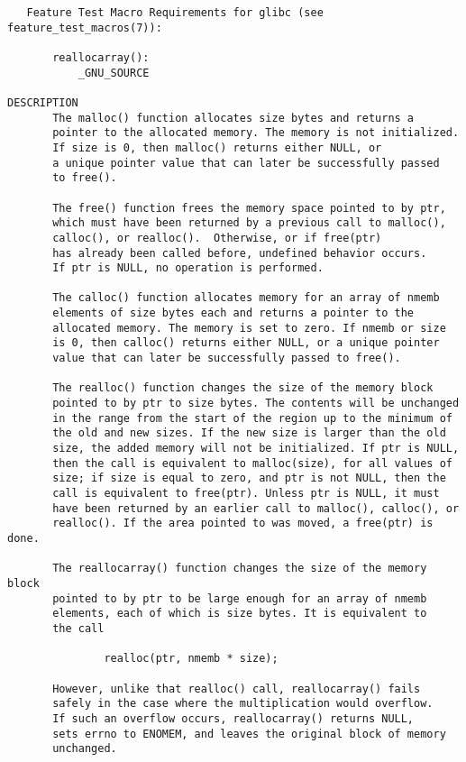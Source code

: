 {\begin{center}
\begin{verbatim}
   Feature Test Macro Requirements for glibc (see feature_test_macros(7)):

       reallocarray():
           _GNU_SOURCE

DESCRIPTION
       The malloc() function allocates size bytes and returns a
       pointer to the allocated memory. The memory is not initialized.
       If size is 0, then malloc() returns either NULL, or     
       a unique pointer value that can later be successfully passed
       to free().

       The free() function frees the memory space pointed to by ptr,
       which must have been returned by a previous call to malloc(),
       calloc(), or realloc().  Otherwise, or if free(ptr)     
       has already been called before, undefined behavior occurs.
       If ptr is NULL, no operation is performed.

       The calloc() function allocates memory for an array of nmemb
       elements of size bytes each and returns a pointer to the
       allocated memory. The memory is set to zero. If nmemb or size
       is 0, then calloc() returns either NULL, or a unique pointer
       value that can later be successfully passed to free().

       The realloc() function changes the size of the memory block
       pointed to by ptr to size bytes. The contents will be unchanged
       in the range from the start of the region up to the minimum of
       the old and new sizes. If the new size is larger than the old
       size, the added memory will not be initialized. If ptr is NULL,
       then the call is equivalent to malloc(size), for all values of
       size; if size is equal to zero, and ptr is not NULL, then the
       call is equivalent to free(ptr). Unless ptr is NULL, it must
       have been returned by an earlier call to malloc(), calloc(), or
       realloc(). If the area pointed to was moved, a free(ptr) is done.

       The reallocarray() function changes the size of the memory block
       pointed to by ptr to be large enough for an array of nmemb
       elements, each of which is size bytes. It is equivalent to
       the call

               realloc(ptr, nmemb * size);

       However, unlike that realloc() call, reallocarray() fails
       safely in the case where the multiplication would overflow.
       If such an overflow occurs, reallocarray() returns NULL,
       sets errno to ENOMEM, and leaves the original block of memory
       unchanged.


\end{verbatim}
\end{center}}
